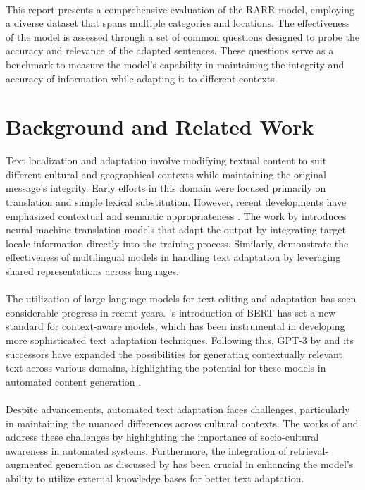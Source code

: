 \documentclass[11pt]{article}
\begin{document}
	\paragraph{}This report presents a comprehensive evaluation of the RARR model, employing a diverse dataset that spans multiple categories and locations. The effectiveness of the model is assessed through a set of common questions designed to probe the accuracy and relevance of the adapted sentences. These questions serve as a benchmark to measure the model's capability in maintaining the integrity and accuracy of information while adapting it to different contexts.
	
	\section{Background and Related Work}
	Text localization and adaptation involve modifying textual content to suit different cultural and geographical contexts while maintaining the original message's integrity. Early efforts in this domain were focused primarily on translation and simple lexical substitution. However, recent developments have emphasized contextual and semantic appropriateness \cite{Sennrich2016, Johnson2017}. The work by \cite{Sennrich2016} introduces neural machine translation models that adapt the output by integrating target locale information directly into the training process. Similarly, \cite{Johnson2017} demonstrate the effectiveness of multilingual models in handling text adaptation by leveraging shared representations across languages.
	
	\paragraph{}The utilization of large language models for text editing and adaptation has seen considerable progress in recent years. \cite{Devlin2019}'s introduction of BERT has set a new standard for context-aware models, which has been instrumental in developing more sophisticated text adaptation techniques. Following this, GPT-3 by \cite{Brown2020} and its successors have expanded the possibilities for generating contextually relevant text across various domains, highlighting the potential for these models in automated content generation \cite{Brown2020, Radford2019}.

	\paragraph{}Despite advancements, automated text adaptation faces challenges, particularly in maintaining the nuanced differences across cultural contexts. The works of \cite{Bender2011} and \cite{Hovy2016} address these challenges by highlighting the importance of socio-cultural awareness in automated systems. Furthermore, the integration of retrieval-augmented generation as discussed by \cite{Lewis2020} has been crucial in enhancing the model's ability to utilize external knowledge bases for better text adaptation.
	
\end{document}
